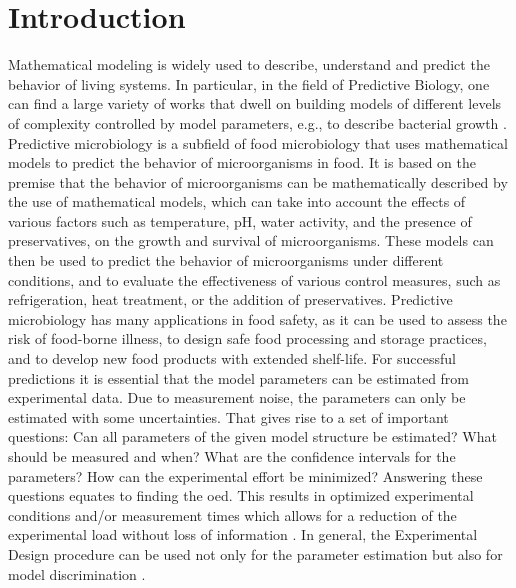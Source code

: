 \documentclass[graybox]{svmult}
\begin{document}
\section*{Introduction}
%
Mathematical modeling is widely used to describe, understand and predict the behavior of living systems.
In particular, in the field of Predictive Biology, one can find a large variety of works that dwell on building models of different levels of complexity controlled by model parameters, e.g., to describe bacterial growth \cite{bernaertsConceptsToolsPredictive2004}.
Predictive microbiology is a subfield of food microbiology that uses mathematical models to predict the behavior of microorganisms in food.
It is based on the premise that the behavior of microorganisms can be mathematically described by the use of mathematical models, which can take into account the effects of various factors such as temperature, pH, water activity, and the presence of preservatives, on the growth and survival of microorganisms.
These models can then be used to predict the behavior of microorganisms under different conditions, and to evaluate the effectiveness of various control measures, such as refrigeration, heat treatment, or the addition of preservatives.
Predictive microbiology has many applications in food safety, as it can be used to assess the risk of food-borne illness, to design safe food processing and storage practices, and to develop new food products with extended shelf-life.
For successful predictions it is essential that the model parameters can be estimated from experimental data.
Due to measurement noise, the parameters can only be estimated with some uncertainties.
That gives rise to a set of important questions: Can all parameters of the given model structure be estimated?
What should be measured and when? What are the confidence intervals for the parameters? How can the experimental effort be minimized?
Answering these questions equates to finding the \ac{oed}.
This results in optimized experimental conditions and/or measurement times which allows for a reduction of the experimental load without loss of information \cite{derlindenImpactExperimentDesign2013, balsa-cantoe.bangaj.r.COMPUTINGOPTIMALDYNAMIC2008}.
In general, the Experimental Design procedure can be used not only for the parameter estimation but also for model discrimination \cite{kreutzSystemsBiology2009, stamatiOptimalExperimentalDesign2016}.
\end{document}
